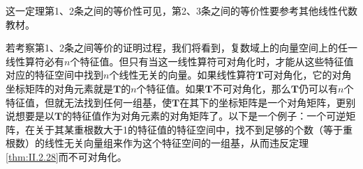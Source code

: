 \documentclass[../main.tex]{subfiles}
\begin{document}
这一定理第1、2条之间的等价性可见\cite[\S 5.2 定理2.1]{周胜林2012线性代数}，第2、3条之间的等价性要参考其他线性代数教材\cite[\S 6.2]{Hoffman1971}。

若考察第1、2条之间等价的证明过程，我们将看到，复数域上的向量空间上的任一线性算符必有$n$个特征值。但只有当这一线性算符可对角化时，才能从这些特征值对应的特征空间中找到$n$个线性无关的向量。如果线性算符$\mathbf{T}$可对角化，它的对角坐标矩阵的对角元素就是$\mathbf{T}$的$n$个特征值。如果$\mathbf{T}$不可对角化，那么$\mathbf{T}$仍可以有$n$个特征值，但就无法找到任何一组基，使$\mathbf{T}$在其下的坐标矩阵是一个对角矩阵，更别说想要是以$\mathbf{T}$的特征值作为对角元素的对角矩阵了。以下是一个例子：一个可逆矩阵，在关于其某重根数大于1的特征值的特征空间中，找不到足够的个数（等于重根数）的线性无关向量组来作为这个特征空间的一组基，从而违反定理\ref{thm:II.2.28}而不可对角化。
\end{document}
